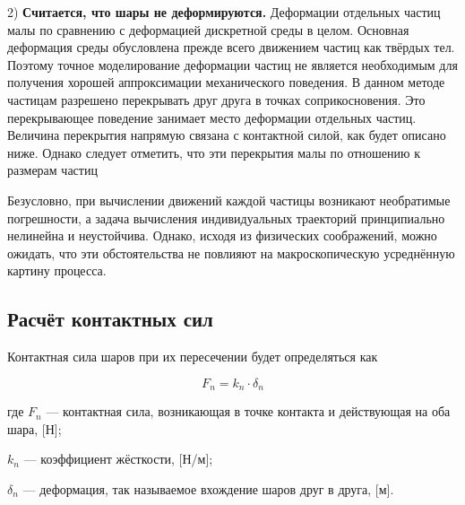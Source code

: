 \documentclass[a4paper]{article}
\begin{document}
2) \textbf{Считается, что шары не деформируются.}
Деформации отдельных частиц малы по сравнению с деформацией дискретной среды в целом. 
Основная деформация среды обусловлена прежде всего движением частиц как твёрдых тел. 
Поэтому точное моделирование деформации частиц не является необходимым для получения хорошей аппроксимации механического поведения. 
В данном методе частицам разрешено перекрывать друг друга в точках соприкосновения. 
Это перекрывающее поведение занимает место деформации отдельных частиц. 
Величина перекрытия напрямую связана с контактной силой, как будет описано ниже.
Однако следует отметить, что эти перекрытия малы по отношению к размерам частиц

Безусловно, при вычислении движений каждой частицы возникают необратимые погрешности, а задача вычисления индивидуальных траекторий принципиально нелинейна и неустойчива.
Однако, исходя из физических соображений, можно ожидать, что эти обстоятельства не повлияют на макроскопическую усреднённую картину процесса.


\subsection{Расчёт контактных сил}
\label{force_subsection}

Контактная сила шаров при их пересечении будет определяться как

\begin{equation}
\label{norm_force}
F_n = k_n \cdot \delta_n
\end{equation}

где $F_n$ --- контактная сила, возникающая в точке контакта и действующая на оба шара, [Н];

$k_n$ --- коэффициент жёсткости, [Н/м];

$\delta_n$ --- деформация, так называемое вхождение шаров друг в друга, [м].
\end{document}
